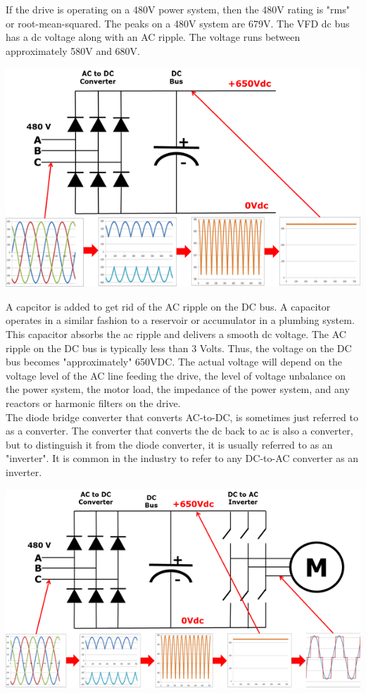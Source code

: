 \documentclass[12pt,a4paper]{scrreprt}
\begin{document}
\begin{enumerate}
    If the drive is operating on a 480V power system, then the 480V rating is "rms" or root-mean-squared. The peaks on a 480V system are 679V. The VFD dc bus has a dc voltage along with an AC ripple. The voltage runs between approximately 580V and 680V.

    \begin{center}
        \includegraphics{vfd2}
    \end{center}

    A capcitor is added to get rid of the AC ripple on the DC bus. A  capacitor operates in a similar fashion to a reservoir or accumulator in a plumbing system. This capacitor absorbs the ac ripple and delivers a smooth dc voltage. The AC ripple on the DC bus is typically less than 3 Volts. Thus, the voltage on the DC bus becomes "approximately" 650VDC. The actual voltage will depend on the voltage level of the AC line feeding the drive, the level of voltage unbalance on the power system, the motor load, the impedance of the power system, and any reactors or harmonic filters on the drive. \\

    The diode bridge converter that converts AC-to-DC, is sometimes just referred to as a converter. The converter that converts the dc back to ac is also a converter, but to distinguish it from the diode converter, it is usually referred to as an "inverter". It is common in the industry to refer to any DC-to-AC converter as an inverter.

    \begin{center}
        \includegraphics{vfd3}
    \end{center}


\end{enumerate}
\end{document}
